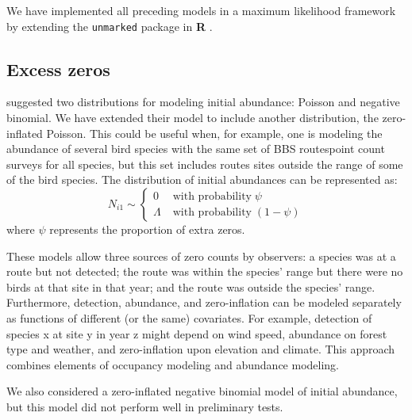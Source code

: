 \documentclass[12pt]{article}
\begin{document}
We have implemented all preceding models in
a maximum likelihood framework by extending the \texttt{unmarked} package
\citep{fiske_chandler:2011} in \textbf{R} \citep{R-2012}.


\subsection{Excess zeros}

\citet{dail_madsen:2011} suggested two distributions for modeling
initial abundance: Poisson and negative binomial.  We have extended
their model to include another distribution, the zero-inflated
Poisson.  This could be useful when, for example, one is modeling the
abundance of several bird species with the same set of BBS routespoint
count surveys for all species, but this set includes routes sites
outside the range of some of the bird species.  The distribution of
initial abundances can be represented as:
\begin{equation}
N_{i1} \sim \left\{
\begin{aligned}
0 &\; \text{with probability} \; \psi \\
\Lambda &\; \text{with probability} \; (1-\psi)
\end{aligned} \right.
\label{eq:ZIP}
\end{equation}
where $\psi$ represents the proportion of extra zeros.

These models allow three sources of zero counts by observers: a
species was at a route but not detected; the route was within the
species' range but there were no birds at that site in that year; and
the route was outside the species' range.  Furthermore, detection,
abundance, and zero-inflation can be modeled separately as functions
of different (or the same) covariates.  For example, detection of
species x at site y in year z might depend on wind speed, abundance on
forest type and weather, and zero-inflation upon elevation and
climate.  This approach combines elements of occupancy modeling
\citep{mackenzie_etal:2006} and abundance modeling.

We also considered a zero-inflated negative binomial model of initial
abundance, but this model did not perform well in preliminary tests.
\end{document}
